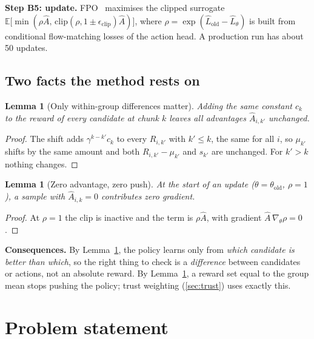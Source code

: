 \documentclass[11pt,a4paper]{article}
\theoremstyle{plain}
\newtheorem{lemma}[proposition]{Lemma}
\theoremstyle{definition}
\theoremstyle{remark}
\newcommand{\E}{\mathbb E}
\begin{document}
\textbf{Step B5: update.} FPO~\cite{fpo} maximises the clipped surrogate $\E\big[\min(\rho\hat A,\,\mathrm{clip}(\rho,1\pm\epsilon_{\mathrm{clip}})\hat A)\big]$, where $\rho=\exp(\hat L_{\mathrm{old}}-\hat L_\theta)$ is built from conditional flow-matching losses of the action head. A production run has about 50 updates.

\subsection{Two facts the method rests on}
\begin{lemma}[Only within-group differences matter]\label{lem:shift}
Adding the same constant $c_k$ to the reward of every candidate at chunk $k$ leaves all advantages $\hat A_{i,k'}$ unchanged.
\end{lemma}
\begin{proof}
The shift adds $\gamma^{k-k'}c_k$ to every $R_{i,k'}$ with $k'\le k$, the same for all $i$, so $\mu_{k'}$ shifts by the same amount and both $R_{i,k'}-\mu_{k'}$ and $s_{k'}$ are unchanged. For $k'>k$ nothing changes.
\end{proof}
\begin{lemma}[Zero advantage, zero push]\label{lem:zero}
At the start of an update ($\theta=\theta_{\mathrm{old}}$, $\rho=1$), a sample with $\hat A_{i,k}=0$ contributes zero gradient.
\end{lemma}
\begin{proof}
At $\rho=1$ the clip is inactive and the term is $\rho\hat A$, with gradient $\hat A\,\nabla_\theta\rho=0$.
\end{proof}
\begin{why}
\textbf{Consequences.} By Lemma~\ref{lem:shift}, the policy learns only from \emph{which candidate is better than which}, so the right thing to check is a \emph{difference} between candidates or actions, not an absolute reward. By Lemma~\ref{lem:zero}, a reward set equal to the group mean stops pushing the policy; trust weighting (\ref{sec:trust}) uses exactly this.
\end{why}

\section{Problem statement}\label{sec:problem}
\end{document}
